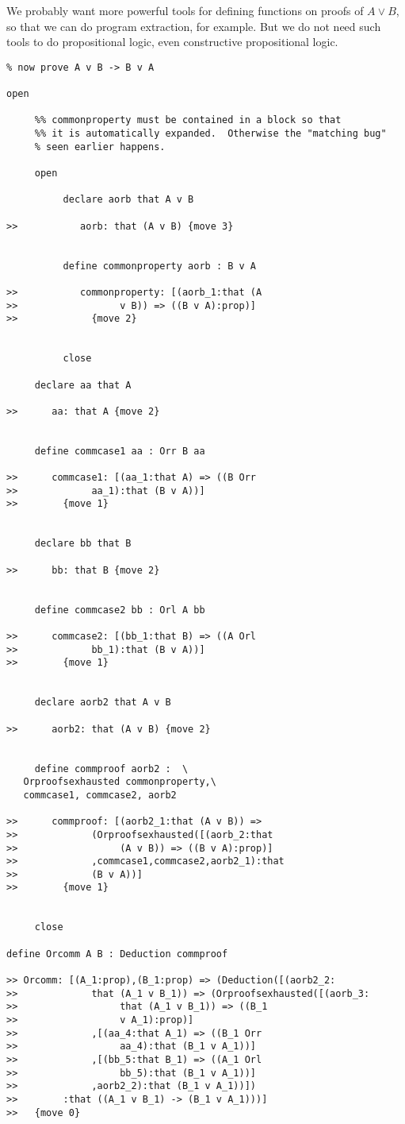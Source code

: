 \documentclass[12pt]{article}
\begin{document}
We probably want more powerful tools for defining functions on proofs of $A \vee B$, so that we can do program extraction, for example.
But we do not need such tools to do propositional logic, even constructive propositional logic.

\begin{verbatim}
% now prove A v B -> B v A

open

     %% commonproperty must be contained in a block so that
     %% it is automatically expanded.  Otherwise the "matching bug"
     % seen earlier happens.

     open

          declare aorb that A v B

>>           aorb: that (A v B) {move 3}


          define commonproperty aorb : B v A

>>           commonproperty: [(aorb_1:that (A 
>>                  v B)) => ((B v A):prop)]
>>             {move 2}


          close

     declare aa that A

>>      aa: that A {move 2}


     define commcase1 aa : Orr B aa

>>      commcase1: [(aa_1:that A) => ((B Orr 
>>             aa_1):that (B v A))]
>>        {move 1}


     declare bb that B

>>      bb: that B {move 2}


     define commcase2 bb : Orl A bb

>>      commcase2: [(bb_1:that B) => ((A Orl 
>>             bb_1):that (B v A))]
>>        {move 1}


     declare aorb2 that A v B

>>      aorb2: that (A v B) {move 2}


     define commproof aorb2 :  \
   Orproofsexhausted commonproperty,\
   commcase1, commcase2, aorb2

>>      commproof: [(aorb2_1:that (A v B)) => 
>>             (Orproofsexhausted([(aorb_2:that 
>>                  (A v B)) => ((B v A):prop)]
>>             ,commcase1,commcase2,aorb2_1):that 
>>             (B v A))]
>>        {move 1}


     close

define Orcomm A B : Deduction commproof

>> Orcomm: [(A_1:prop),(B_1:prop) => (Deduction([(aorb2_2:
>>             that (A_1 v B_1)) => (Orproofsexhausted([(aorb_3:
>>                  that (A_1 v B_1)) => ((B_1 
>>                  v A_1):prop)]
>>             ,[(aa_4:that A_1) => ((B_1 Orr 
>>                  aa_4):that (B_1 v A_1))]
>>             ,[(bb_5:that B_1) => ((A_1 Orl 
>>                  bb_5):that (B_1 v A_1))]
>>             ,aorb2_2):that (B_1 v A_1))])
>>        :that ((A_1 v B_1) -> (B_1 v A_1)))]
>>   {move 0}



\end{verbatim}
\end{document}
